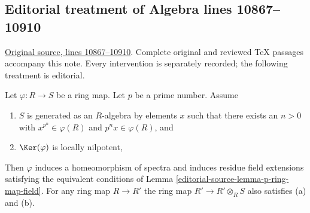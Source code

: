 \subsection{Editorial treatment of Algebra lines 10867--10910}

\hypertarget{algebra-context-131}{}

\noindent\href{https://github.com/stacks/stacks-project/blob/a04446e57ec1fbc252a871afcec7752fb2807b14/algebra.tex\#L10867}{Original source, lines 10867--10910}. Complete original and reviewed TeX passages accompany this note. Every intervention is separately recorded; the following treatment is editorial.


\begin{lemma}
\label{editorial-source-lemma-p-ring-map}
Let $\varphi : R \to S$ be a ring map. Let $p$ be a prime number. Assume
\begin{enumerate}
\item[(a)] $S$ is generated as an $R$-algebra by elements $x$ such
that there exists an $n > 0$ with $x^{p^n} \in \varphi(R)$ and
$p^nx \in \varphi(R)$, and
\item[(b)] $\Ker(\varphi)$ is locally nilpotent,
\end{enumerate}
Then $\varphi$ induces a homeomorphism of spectra and induces
residue field extensions satisfying the equivalent conditions
of Lemma \ref{editorial-source-lemma-p-ring-map-field}. For any ring map $R \to R'$
the ring map $R' \to R' \otimes_R S$ also satisfies (a) and (b).
\end{lemma}

